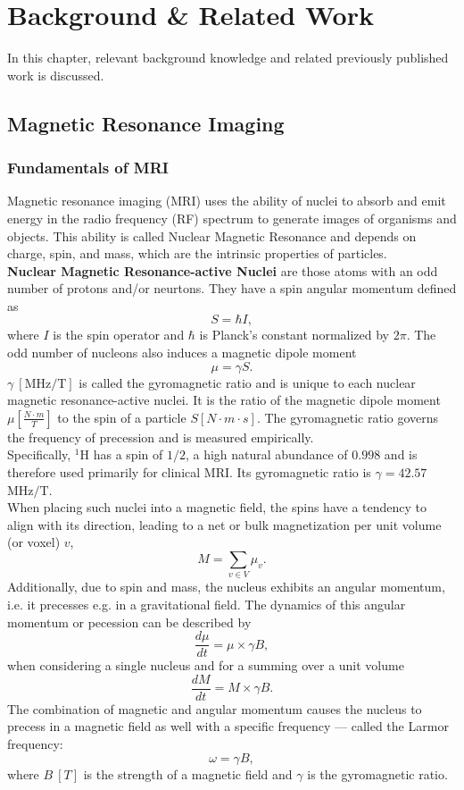 \chapter{Background \& Related Work}
In this chapter, relevant background knowledge and related previously published work is discussed.

\section{Magnetic Resonance Imaging}
\subsection{Fundamentals of MRI}
Magnetic resonance imaging (MRI) uses the ability of nuclei to absorb and emit energy in the radio frequency (RF) spectrum to generate images of organisms and objects.
This ability is called Nuclear Magnetic Resonance and depends on charge, spin, and mass, which are the intrinsic properties of particles. \\
\textbf{Nuclear Magnetic Resonance-active Nuclei} are those atoms with an odd number of protons and/or neurtons\autocite{nishimura, halliday}.
They have a spin angular momentum defined as
\[ S = \hbar I, \]
where $I$ is the spin operator and $\hbar$ is Planck's constant normalized by $2\pi$.
The odd number of nucleons also induces a magnetic dipole moment
\[ \mu  = \gamma S. \]
$\gamma \ [\text{MHz} / \text{T}]$ is called the gyromagnetic ratio and is unique to each nuclear magnetic resonance-active nuclei.
It is the ratio of the magnetic dipole moment $\mu \left[ \frac{N \cdot m}{T} \right]$ to the spin of a particle $S [N \cdot m \cdot s]$.
The gyromagnetic ratio governs the frequency of precession and is measured empirically. \\
Specifically, ${}^1$H has a spin of $1 / 2$, a high natural abundance of $0.998$ and is therefore used primarily for clinical MRI.
Its gyromagnetic ratio is $\gamma = 42.57$ MHz$/$T.\\
When placing such nuclei into a magnetic field, the spins have a tendency to align with its direction, leading to a net or bulk magnetization per unit volume (or voxel) $v$,
\[ M = \sum_{v \in V} \mu_v. \]
Additionally, due to spin and mass, the nucleus exhibits an angular momentum, i.e. it precesses e.g. in a gravitational field.
The dynamics of this angular momentum  or pecession can be described by
\[ \frac{d \mu}{d t} = \mu \times \gamma B, \]
when considering a single nucleus and for a summing over a unit volume
\[ \frac{d M}{d t} = M \times \gamma B. \]
The combination of magnetic and angular momentum causes the nucleus to precess in a magnetic field as well with a specific frequency --- called the Larmor frequency:
\[ \omega = \gamma B, \]
where $B \ [T]$ is the strength of a magnetic field and $\gamma$ is the gyromagnetic ratio.

